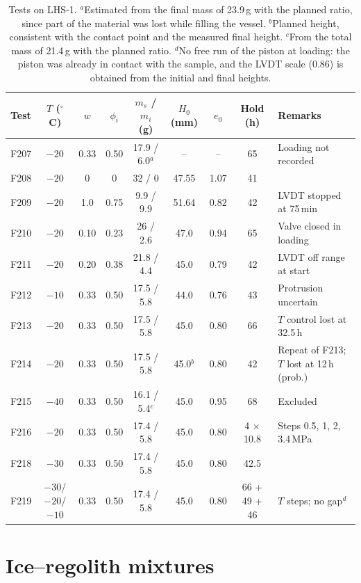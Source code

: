 \begin{table}[H]
\centering
\footnotesize
\setlength{\tabcolsep}{3.5pt}
\begin{tabularx}{\textwidth}{@{}lcccccccX@{}}
\toprule
Test & $T$ ($^\circ$C) & $w$ & $\phi_i$ & $m_s$ / $m_i$ (g) & $H_0$ (mm) & $e_0$ & Hold (h) & Remarks \\
\midrule
F207 & $-20$ & 0.33 & 0.50 & 17.9 / 6.0$^{a}$ & -- & -- & 65 & Loading not recorded \\
F208 & $-20$ & 0 & 0 & 32 / 0 & 47.55 & 1.07 & 41 & \\
F209 & $-20$ & 1.0 & 0.75 & 9.9 / 9.9 & 51.64 & 0.82 & 42 & LVDT stopped at 75\,min \\
F210 & $-20$ & 0.10 & 0.23 & 26 / 2.6 & 47.0 & 0.94 & 65 & Valve closed in loading \\
F211 & $-20$ & 0.20 & 0.38 & 21.8 / 4.4 & 45.0 & 0.79 & 42 & LVDT off range at start \\
F212 & $-10$ & 0.33 & 0.50 & 17.5 / 5.8 & 44.0 & 0.76 & 43 & Protrusion uncertain \\
F213 & $-20$ & 0.33 & 0.50 & 17.5 / 5.8 & 45.0 & 0.80 & 66 & $T$ control lost at 32.5\,h \\
F214 & $-20$ & 0.33 & 0.50 & 17.5 / 5.8 & 45.0$^{b}$ & 0.80 & 42 & Repeat of F213; $T$ lost at 12\,h (prob.) \\
F215 & $-40$ & 0.33 & 0.50 & 16.1 / 5.4$^{c}$ & 45.0 & 0.95 & 68 & Excluded \\
F216 & $-20$ & 0.33 & 0.50 & 17.4 / 5.8 & 45.0 & 0.80 & 4 $\times$ 10.8 & Steps 0.5, 1, 2, 3.4\,MPa \\
F218 & $-30$ & 0.33 & 0.50 & 17.4 / 5.8 & 45.0 & 0.80 & 42.5 & \\
F219 & $-30$/$-20$/$-10$ & 0.33 & 0.50 & 17.4 / 5.8 & 45.0 & 0.80 & 66 + 49 + 46 & $T$ steps; no gap$^{d}$ \\
\bottomrule
\end{tabularx}
\caption{Tests on LHS-1. $^{a}$Estimated from the final mass of 23.9\,g with the planned ratio, since part of the material was lost while filling the vessel. $^{b}$Planned height, consistent with the contact point and the measured final height. $^{c}$From the total mass of 21.4\,g with the planned ratio. $^{d}$No free run of the piston at loading: the piston was already in contact with the sample, and the LVDT scale (0.86) is obtained from the initial and final heights.}
\label{tab:tests_lhs1}
\end{table}

\section{Ice--regolith mixtures}
\label{sec:results_mixtures}
